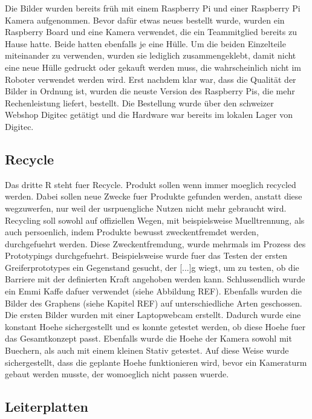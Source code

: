 Die Bilder wurden bereits früh mit einem Raspberry Pi und einer Raspberry Pi Kamera aufgenommen. Bevor dafür etwas neues bestellt wurde, wurden ein Raspberry Board und eine Kamera verwendet, die ein Teammitglied bereits zu Hause hatte. Beide hatten ebenfalls je eine Hülle.
Um die beiden Einzelteile miteinander zu verwenden, wurden sie lediglich zusammengeklebt, damit nicht eine neue Hülle gedruckt oder gekauft werden muss, die wahrscheinlich nicht im Roboter verwendet werden wird.
Erst nachdem klar war, dass die Qualität der Bilder in Ordnung ist, wurden die neuste Version des Raspberry Pis, die mehr Rechenleistung liefert, bestellt. Die Bestellung wurde über den schweizer Webshop Digitec getätigt und die Hardware war bereits im lokalen Lager von Digitec. 



\subsection{Recycle}

Das dritte R steht fuer Recycle. Produkt sollen wenn immer moeglich recycled werden. Dabei sollen neue Zwecke fuer Produkte gefunden werden, anstatt diese wegzuwerfen, nur weil der usrpuengliche Nutzen nicht mehr gebraucht wird. Recycling soll sowohl auf offiziellen Wegen, mit beispielsweise Muelltrennung, als auch persoenlich, indem Produkte bewusst zweckentfremdet werden, durchgefuehrt werden. Diese Zweckentfremdung, wurde mehrmals im Prozess des Prototypings durchgefuehrt. Beispielsweise wurde fuer das Testen der ersten Greiferprototypes ein Gegenstand gesucht, der [...]g wiegt, um zu testen, ob die Barriere mit der definierten Kraft angehoben werden kann. Schlussendlich wurde ein Emmi Kaffe dafuer verwendet (siehe Abbildung REF). Ebenfalls wurden die Bilder des Graphens (siehe Kapitel REF) auf unterschiedliche Arten geschossen. Die ersten Bilder wurden mit einer Laptopwebcam erstellt. Dadurch wurde eine konstant Hoehe sichergestellt und es konnte getestet werden, ob diese Hoehe fuer das Gesamtkonzept passt. Ebenfalls wurde die Hoehe der Kamera sowohl mit Buechern, als auch mit einem kleinen Stativ getestet. Auf diese Weise wurde sichergestellt, dass die geplante Hoehe funktionieren wird, bevor ein Kameraturm gebaut werden musste, der womoeglich nicht passen wuerde.


\subsection{Leiterplatten}
\label{Leiterplatten}


